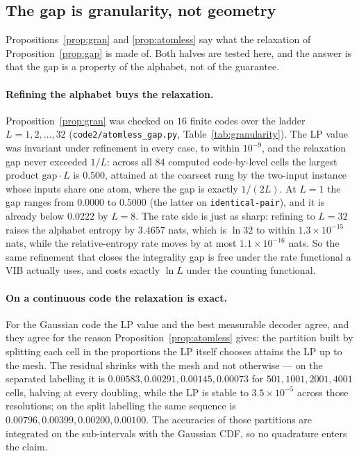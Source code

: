 \documentclass[11pt]{article}
\begin{document}
\subsection{The gap is granularity, not geometry}\label{sec:granularity}
Propositions~\ref{prop:gran} and \ref{prop:atomless} say what the relaxation of
Proposition~\ref{prop:gap} is made of. Both halves are tested here, and the answer is that the gap
is a property of the alphabet, not of the guarantee.

\paragraph{Refining the alphabet buys the relaxation.}
Proposition~\ref{prop:gran} was checked on $16$ finite codes over the ladder
$L=1,2,\dots,32$ (\texttt{code2/atomless\_gap.py}, Table~\ref{tab:granularity}). The LP value was
invariant under refinement in every case, to within $10^{-9}$, and the relaxation gap never
exceeded $1/L$: across all $84$ computed code-by-level cells the largest product
$\mathrm{gap}\cdot L$ is $0.500$, attained at the coarsest rung by the two-input instance whose
inputs share one atom, where the gap is exactly $1/(2L)$. At $L=1$ the gap ranges from $0.0000$ to
$0.5000$ (the latter on \texttt{identical-pair}), and it is already below $0.0222$ by $L=8$. The rate side is
just as sharp: refining to $L=32$ raises the alphabet entropy by $3.4657$ nats, which is $\ln 32$
to within $1.3\times 10^{-15}$ nats, while the relative-entropy rate moves by at most $1.1\times 10^{-16}$ nats. So the same
refinement that closes the integrality gap is free under the rate functional a VIB actually uses,
and costs exactly $\ln L$ under the counting functional.

\paragraph{On a continuous code the relaxation is exact.}
For the Gaussian code the LP value and the best measurable decoder agree, and they agree for the
reason Proposition~\ref{prop:atomless} gives: the partition built by splitting each cell in the
proportions the LP itself chooses attains the LP up to the mesh. The residual shrinks with the
mesh and not otherwise --- on the separated labelling it is $0.00583, 0.00291, 0.00145, 0.00073$ for $501,1001,2001,4001$
cells, halving at every doubling, while the LP is stable to $3.5\times 10^{-5}$ across those resolutions;
on the split labelling the same sequence is $0.00796, 0.00399, 0.00200, 0.00100$. The accuracies of those partitions are
integrated on the sub-intervals with the Gaussian CDF, so no quadrature enters the claim.
\end{document}
